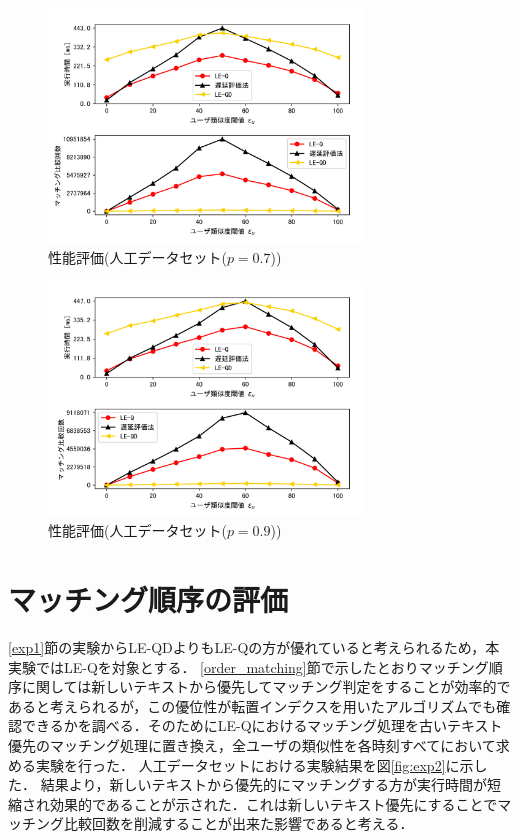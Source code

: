 \begin{figure}[H]
    \centering
    \includegraphics[width=8.3cm]{eimg/exp1_7.png}
    \caption{性能評価(人工データセット($p=0.7$))}
    \label{fig:exp1_art_7}
\end{figure}
\begin{figure}[H]
    \centering
    \includegraphics[width=8.3cm]{eimg/exp1_9.png}
    \caption{性能評価(人工データセット($p=0.9$))}
    \label{fig:exp1_art_9}
\end{figure}



\section{マッチング順序の評価}
\ref{exp1}節の実験からLE-QDよりもLE-Qの方が優れていると考えられるため，本実験ではLE-Qを対象とする．
\ref{order_matching}節で示したとおりマッチング順序に関しては新しいテキストから優先してマッチング判定をすることが効率的であると考えられるが，この優位性が転置インデクスを用いたアルゴリズムでも確認できるかを調べる．そのためにLE-Qにおけるマッチング処理を古いテキスト優先のマッチング処理に置き換え，全ユーザの類似性を各時刻すべてにおいて求める実験を行った．
人工データセットにおける実験結果を図\ref{fig:exp2}に示した．
結果より，新しいテキストから優先的にマッチングする方が実行時間が短縮され効果的であることが示された．これは新しいテキスト優先にすることでマッチング比較回数を削減することが出来た影響であると考える．

